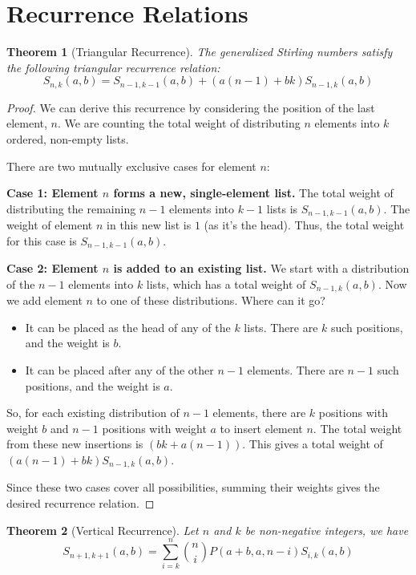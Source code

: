 \documentclass{article}
\newtheorem{theorem}{Theorem}
\newcommand{\gsn}[2]{S_{#1,#2}(a,b)}
\newcommand{\rising}[3]{P(#1,#2,#3)}
\begin{document}
\section{Recurrence Relations}

\begin{theorem}[Triangular Recurrence]
The generalized Stirling numbers satisfy the following triangular recurrence relation:
\begin{equation}
\gsn{n}{k} = \gsn{n-1}{k-1} + (a(n-1) + bk)\gsn{n-1}{k}
\end{equation}
\end{theorem}

\begin{proof}
We can derive this recurrence by considering the position of the last element, $n$. We are counting the total weight of distributing $n$ elements into $k$ ordered, non-empty lists.

There are two mutually exclusive cases for element $n$:

\textbf{Case 1: Element $n$ forms a new, single-element list.}
The total weight of distributing the remaining $n-1$ elements into $k-1$ lists is $\gsn{n-1}{k-1}$. The weight of element $n$ in this new list is $1$ (as it's the head). Thus, the total weight for this case is $\gsn{n-1}{k-1}$.

\textbf{Case 2: Element $n$ is added to an existing list.}
We start with a distribution of the $n-1$ elements into $k$ lists, which has a total weight of $\gsn{n-1}{k}$. Now we add element $n$ to one of these distributions. Where can it go?
\begin{itemize}
    \item It can be placed as the head of any of the $k$ lists. There are $k$ such positions, and the weight is $b$.
    \item It can be placed after any of the other $n-1$ elements. There are $n-1$ such positions, and the weight is $a$.
\end{itemize}
So, for each existing distribution of $n-1$ elements, there are $k$ positions with weight $b$ and $n-1$ positions with weight $a$ to insert element $n$. The total weight from these new insertions is $(bk + a(n-1))$. This gives a total weight of $(a(n-1) + bk)\gsn{n-1}{k}$.

Since these two cases cover all possibilities, summing their weights gives the desired recurrence relation.
\end{proof}

\begin{theorem}[Vertical Recurrence]
Let $n$ and $k$ be non-negative integers, we have
\begin{equation}
\gsn{n+1}{k+1}=\sum_{i=k}^{n}\binom{n}{i} \rising{a+b}{a}{n-i} \gsn{i}{k}
\end{equation}
\end{theorem}
\end{document}
